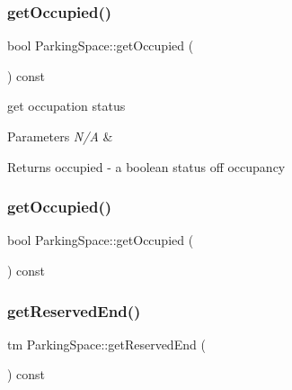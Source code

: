 \subsubsection{\texorpdfstring{get\+Occupied()}{getOccupied()}\hspace{0.1cm}{\footnotesize\ttfamily [1/2]}}
{\footnotesize\ttfamily bool Parking\+Space\+::get\+Occupied (\begin{DoxyParamCaption}{ }\end{DoxyParamCaption}) const}



get occupation status 


\begin{DoxyParams}{Parameters}
{\em N/A} & \\
\hline
\end{DoxyParams}
\begin{DoxyReturn}{Returns}
occupied -\/ a boolean status off occupancy 
\end{DoxyReturn}
\mbox{\label{class_parking_space_afc40502f401e7689685be6248c2ce097}} 
\subsubsection{\texorpdfstring{get\+Occupied()}{getOccupied()}\hspace{0.1cm}{\footnotesize\ttfamily [2/2]}}
{\footnotesize\ttfamily bool Parking\+Space\+::get\+Occupied (\begin{DoxyParamCaption}{ }\end{DoxyParamCaption}) const}

\mbox{\label{class_parking_space_a9048ab587b0287dabfa0f8cc202e8bb5}} 
\subsubsection{\texorpdfstring{get\+Reserved\+End()}{getReservedEnd()}\hspace{0.1cm}{\footnotesize\ttfamily [1/2]}}
{\footnotesize\ttfamily tm Parking\+Space\+::get\+Reserved\+End (\begin{DoxyParamCaption}{ }\end{DoxyParamCaption}) const}



